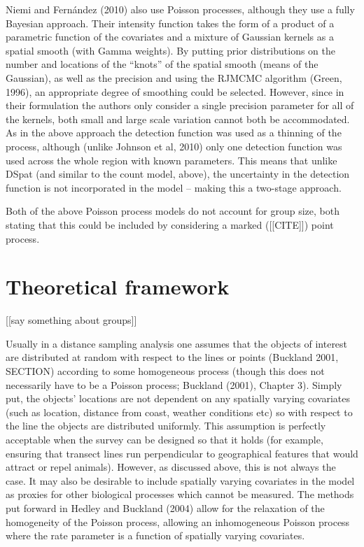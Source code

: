 \documentclass[useAMS,referee]{biom}
\begin{document}
Niemi and Fern\'andez (2010) also use Poisson processes, although they use a fully Bayesian approach. Their intensity function takes the form of a product of a parametric function of the covariates and a mixture of Gaussian kernels as a spatial smooth (with Gamma weights). By putting prior distributions on the number and locations of the ``knots'' of the spatial smooth (means of the Gaussian), as well as the precision and using the RJMCMC algorithm (Green, 1996), an appropriate degree of smoothing could be selected. However, since in their formulation the authors only consider a single precision parameter for all of the kernels, both small and large scale variation cannot both be accommodated. As in the above approach the detection function was used as a thinning of the process, although (unlike Johnson et al, 2010) only one detection function was used across the whole region with known parameters. This means that unlike DSpat (and similar to the count model, above), the uncertainty in the detection function is not incorporated in the model -- making this a two-stage approach.


Both of the above Poisson process models do not account for group size, both stating that this could be included by considering a marked ([[CITE]]) point process.



\section{Theoretical framework}
\label{s:theory}

[[say something about groups]]

Usually in a distance sampling analysis one assumes that the objects of interest are distributed at random with respect to the lines or points (Buckland 2001, SECTION) according to some homogeneous process (though this does not necessarily have to be a Poisson process; Buckland (2001), Chapter 3). Simply put, the objects' locations are not dependent on any spatially varying covariates (such as location, distance from coast, weather conditions etc) so with respect to the line the objects are distributed uniformly. This assumption is perfectly acceptable when the survey can be designed so that it holds (for example, ensuring that transect lines run perpendicular to geographical features that would attract or repel animals). However, as discussed above, this is not always the case. It may also be desirable to include spatially varying covariates in the model as proxies for other biological processes which cannot be measured. The methods put forward in Hedley and Buckland (2004) allow for the relaxation of the homogeneity of the Poisson process, allowing an inhomogeneous Poisson process where the rate parameter is a function of spatially varying covariates.
\end{document}
